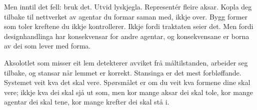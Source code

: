 \begin{widebody}
{Men inntil det fell: bruk det. Utvid lyskjegla. Representér fleire aksar. Kopla deg tilbake til nettverket av agentar du formar saman med, ikkje over. Bygg former som toler kreftene du ikkje kontrollerer. Ikkje fordi traktaten seier det. Men fordi designhandlinga har konsekvensar for andre agentar, og konsekvensane er borna av dei som lever med forma.

Aksolotlet som misser eit lem detekterer avviket frå måltilstanden, arbeider seg tilbake, og stansar når lemmet er korrekt. Stansinga er det mest forbløffande. Systemet veit kva det skal vere. Spørsmålet er om du veit kva formene dine skal vere; ikkje kva dei skal sjå ut som, men kor mange aksar dei skal tole, kor mange agentar dei skal tene, kor mange krefter dei skal stå i.
}
\end{widebody}
